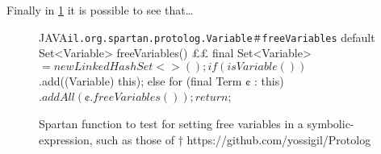 Finally in \cref{figure:shock-3} it is possible to see that…

\begin{figure}[ht]
    \caption{%
      Spartan function to test for setting free variables in a symbolic-expression, such as those of \protect\Prolog†{%
      https://github.com/yossigil/Protolog
      }
    }
\label{figure:shock-3}
\begin{Code}{JAVA}{\scriptsize\texttt{il.org.spartan.protolog.Variable＃freeVariables}}
default Set<Variable> freeVariables() {££
    final Set<Variable> $ = new LinkedHashSet<>();
    if (isVariable())
     $.add((Variable) this);
    else
      for (final Term ¢ : this)
       $.addAll(¢.freeVariables());
    return $;
  }
\end{Code}
\end{figure}
